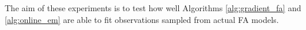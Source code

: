 \documentclass[msc,deptreport.inf]{infthesis} %
\newcommand{\matr}[1]{\mathbf{#1}}
\newcommand{\R}{\mathbb R}
\begin{document}
The aim of these experiments is to test how well Algorithms \ref{alg:gradient_fa} and \ref{alg:online_em} are able to fit observations sampled from actual FA models. 
\end{document}
